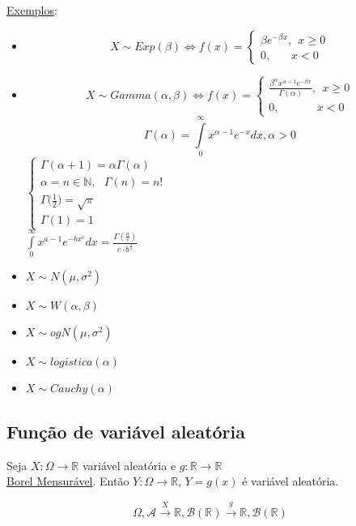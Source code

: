 \documentclass[a4paper,12pt]{article}
\begin{document}
\newpage
\underline{Exemplos}:
\begin{itemize}
	\item
$$X\sim Exp(\beta) \Leftrightarrow f(x)=\begin{cases}
\beta e^{-\beta x}, \ \ x\ge 0\\
0, \ \ \ \ \ \ \ \  x<0
\end{cases} $$
\item 

$$X\sim Gamma(\alpha,\beta) \Leftrightarrow f(x)=\begin{cases}
\frac{\beta^\alpha x^{\alpha-1}e^{-\beta x}}{\Gamma(\alpha)}, \ \ x\ge 0\\
0, \ \ \ \ \ \ \ \ \ \ \ \ \ \  \   x<0
\end{cases} $$
$$\Gamma(\alpha)= \int\limits_{0}^\infty x^{\alpha-1}e^{-x}dx, \alpha>0 $$
$\begin{cases}
\Gamma(\alpha+1)=\alpha\Gamma(\alpha)\\
\alpha=n\in \mathbb N, \ \ \ \Gamma(n)=n!\\
\Gamma\bigg( \frac{1}{2}\bigg) = \sqrt \pi\\
\Gamma(1)=1
\end{cases}
$\\
$\int\limits_{0}^{\infty} x^{a-1} e^{- bx^c}dx=\frac{\Gamma (\frac{a}{c} )}{c\cdot b^{\frac{a}{c}}} $
\item $X\sim N(\mu,\sigma^2)$
\item $X\sim W(\alpha,\beta) $
\item $X\sim ogN(\mu,\sigma^2) $
\item $X\sim logistica (\alpha)$
\item $X\sim Cauchy(\alpha)$ 
\end{itemize}

\newpage

\subsection{Função de variável aleatória}
Seja $X:\Omega \rightarrow \mathbb R $ variável aleatória e $g: \mathbb R \longrightarrow \mathbb R$\\
\underline{Borel Mensurável}. Então $Y:\Omega \rightarrow \mathbb R$, $Y=g(x)$ é variável aleatória.

$$\Omega,\mathscr{A} \overset{X}{\longrightarrow}  \mathbb R , \mathscr{B}(\mathbb{R})  \overset{g}{\longrightarrow} \mathbb R,\mathscr{B}(\mathbb{R})  $$
\end{document}

